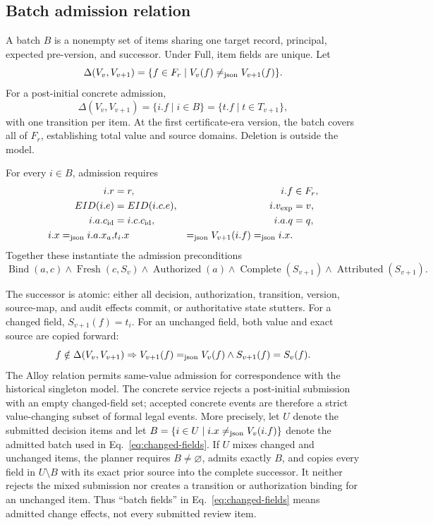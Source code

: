 \subsection{Batch admission relation}

A batch $B$ is a nonempty set of items sharing one target record, principal, expected pre-version, and successor. Under Full, item fields are unique. Let
\begin{equation}
\Delta(V_v,V_{v+1})=\{f\in F_r\mid V_v(f)\mathrel{\neq_{\mathrm{json}}} V_{v+1}(f)\}.
\end{equation}
For a post-initial concrete admission,
\begin{equation}
\Delta(V_v,V_{v+1})=\{i.f\mid i\in B\}=\{t.f\mid t\in T_{v+1}\},
\label{eq:changed-fields}
\end{equation}
with one transition per item. At the first certificate-era version, the batch covers all of $F_r$, establishing total value and source domains. Deletion is outside the model.

For every $i\in B$, admission requires
\begin{align}
i.r &= r, & i.f&\in F_r,\nonumber\\
EID(i.e) &= EID(i.c.e), & i.v_{\mathrm{exp}}&=v,\nonumber\\
i.a.c_{\mathrm{id}}&=i.c.c_{\mathrm{id}}, & i.a.q&=q,\nonumber\\
i.x\mathrel{=_{\mathrm{json}}} i.a.x_a, & t_i.x&\mathrel{=_{\mathrm{json}}} V_{v+1}(i.f)\mathrel{=_{\mathrm{json}}} i.x.
\label{eq:item-bindings}
\end{align}
Together these instantiate the admission preconditions
\begin{equation}
\operatorname{Bind}(a,c)\land\operatorname{Fresh}(c,S_v)\land
\operatorname{Authorized}(a)\land\operatorname{Complete}(S_{v+1})\land
\operatorname{Attributed}(S_{v+1}).
\end{equation}

The successor is atomic: either all decision, authorization, transition, version, source-map, and audit effects commit, or authoritative state stutters. For a changed field, $S_{v+1}(f)=t_i$. For an unchanged field, both value and exact source are copied forward:
\begin{equation}
f\notin\Delta(V_v,V_{v+1})\Rightarrow
V_{v+1}(f)\mathrel{=_{\mathrm{json}}} V_v(f)\land S_{v+1}(f)=S_v(f).
\label{eq:copy-forward}
\end{equation}
The Alloy relation permits same-value admission for correspondence with the historical singleton model. The concrete service rejects a post-initial submission with an empty changed-field set; accepted concrete events are therefore a strict value-changing subset of formal legal events. More precisely, let $U$ denote the submitted decision items and let $B=\{i\in U\mid i.x\mathrel{\neq_{\mathrm{json}}} V_v(i.f)\}$ denote the admitted batch used in Eq.~\eqref{eq:changed-fields}. If $U$ mixes changed and unchanged items, the planner requires $B\neq\varnothing$, admits exactly $B$, and copies every field in $U\setminus B$ with its exact prior source into the complete successor. It neither rejects the mixed submission nor creates a transition or authorization binding for an unchanged item. Thus ``batch fields'' in Eq.~\eqref{eq:changed-fields} means admitted change effects, not every submitted review item.

